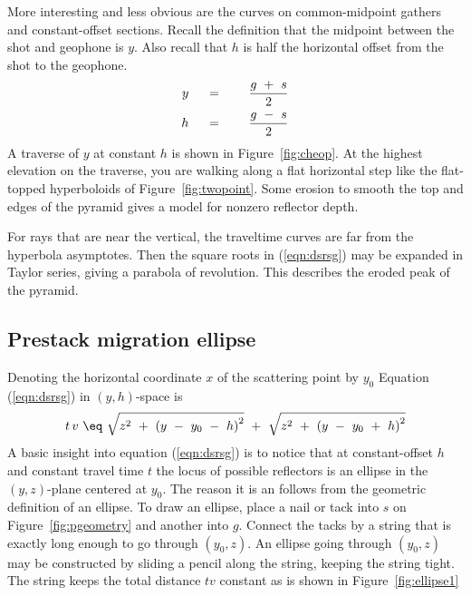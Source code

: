 \par
More interesting and less obvious are the curves
on common-midpoint gathers and constant-offset sections.
Recall the definition that the midpoint between the shot and geophone is  $y$.
Also recall that  $h$  is half the horizontal offset
from the shot to the geophone.
\begin{eqnarray}
y\ \ \ \ &=&\ \ \ \ {g \ +\  s  \over 2 }
\label{eqn:2.5a}
\\
h\ \ \ \ &=&\ \ \ \ {g \ -\  s  \over 2 }
\label{eqn:2.5b}
\end{eqnarray}
A traverse
of $y$ at constant $h$ is shown in Figure~\ref{fig:cheop}.
At the highest elevation on the traverse,
you are walking along a flat horizontal
step like the flat-topped hyperboloids of Figure~\ref{fig:twopoint}.
Some erosion to smooth the top and edges of the pyramid
gives a model for nonzero reflector depth.
\par
For rays that are near the vertical,
the traveltime curves are far from the hyperbola asymptotes.
Then the square roots in (\ref{eqn:dsrsg}) may be expanded in Taylor series,
giving a parabola of revolution.
This describes the eroded peak of the pyramid.

\subsection{Prestack migration ellipse}
Denoting the horizontal coordinate $x$ of the scattering point by $y_0$
Equation (\ref{eqn:dsrsg}) in $(y,h)$-space is
\begin{equation}
t\,v\  \eq \  \sqrt { z^2\ +\ {( y \ -\  y_0  \  - \  h) }^2}  
     \ +\  \sqrt { z^2\ +\ {( y \ -\  y_0   \ + \  h) }^2} 
\label{eqn:dsryh}
\end{equation}
A basic insight into equation (\ref{eqn:dsrsg}) is to notice
that at constant-offset  $h$  and constant travel time  $t$
the locus of possible reflectors is
an ellipse in the $(y ,z)$-plane centered at $y_0$.
The reason it is an 
follows from the geometric definition of an ellipse.
To draw an ellipse,
place a nail or tack into $s$ on Figure~\ref{fig:pgeometry}
and another into $g$.
Connect the tacks by a string
that is exactly long enough to go through  $(y_0 ,z)$.
An ellipse going through  $(y_0 ,z)$  may be constructed
by sliding a pencil along the string,
keeping the string tight.
The string keeps the total distance  $tv$  constant as is shown in
Figure~\ref{fig:ellipse1}
\par

